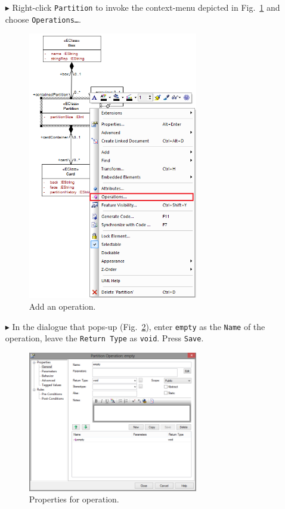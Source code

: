 \begin{enumerate}
\item[$\blacktriangleright$] Right-click \texttt{Partition} to invoke the context-menu depicted in Fig.~\ref{fig:add_operation} and choose \texttt{Operations\ldots}.

\begin{figure}[htbp]
	\centering
  \includegraphics[width=0.7\textwidth]{pics/memBoxBilder/memBox35.png}
	\caption{Add an operation.}
	\label{fig:add_operation}
\end{figure}
\FloatBarrier

\item[$\blacktriangleright$] In the dialogue that pops-up (Fig.~\ref{fig:operation_properties}), enter \texttt{empty} as the \texttt{Name} of the operation, leave the \texttt{Return Type} as \texttt{void}.  Press \texttt{Save}.

\begin{figure}[htbp]
	\centering
  	\includegraphics[width=0.7\textwidth]{pics/memBoxBilder/memBox37.png}
	\caption{Properties for operation.}
	\label{fig:operation_properties}
\end{figure}
\FloatBarrier


\end{enumerate}
